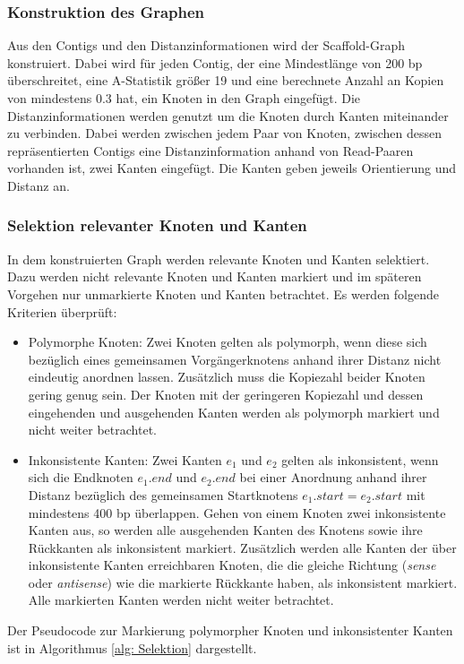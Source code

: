 \documentclass[a4paper,11pt,parskip]{scrartcl}
\begin{document}
\subsubsection{Konstruktion des Graphen}
Aus den Contigs und den Distanzinformationen wird der Scaffold-Graph
konstruiert. Dabei wird für jeden Contig, der eine Mindestlänge von
200 bp überschreitet, eine A-Statistik größer 19 und eine berechnete
Anzahl an Kopien von mindestens \num{0.3} hat, ein Knoten in den Graph
eingefügt. Die Distanzinformationen werden genutzt um die Knoten durch
Kanten miteinander zu verbinden. Dabei werden zwischen jedem Paar von
Knoten, zwischen dessen repräsentierten Contigs eine
Distanzinformation anhand von Read-Paaren vorhanden ist, zwei Kanten
eingefügt. Die Kanten geben jeweils Orientierung und Distanz an.

\subsubsection{Selektion relevanter Knoten und Kanten}
In dem konstruierten Graph werden relevante Knoten und Kanten
selektiert. Dazu werden nicht relevante Knoten und Kanten markiert und
im späteren Vorgehen nur unmarkierte Knoten und Kanten betrachtet. Es
werden folgende Kriterien überprüft:
\begin{itemize}
\item Polymorphe Knoten: Zwei Knoten gelten als polymorph, wenn diese
  sich bezüglich eines gemeinsamen Vorgängerknotens anhand ihrer
  Distanz nicht eindeutig anordnen lassen. Zusätzlich muss die
  Kopiezahl beider Knoten gering genug sein. Der Knoten mit der
  geringeren Kopiezahl und dessen eingehenden und ausgehenden Kanten
  werden als polymorph markiert und nicht weiter betrachtet.
\item Inkonsistente Kanten: Zwei Kanten $e_1$ und $e_2$ gelten als
  inkonsistent, wenn sich die Endknoten $e_1.end$ und $e_2.end$ bei
  einer Anordnung anhand ihrer Distanz bezüglich des gemeinsamen
  Startknotens $e_1.start = e_2.start$ mit mindestens 400 bp
  überlappen. Gehen von einem Knoten zwei inkonsistente Kanten aus, so
  werden alle ausgehenden Kanten des Knotens sowie ihre Rückkanten als
  inkonsistent markiert. Zusätzlich werden alle Kanten der über
  inkonsistente Kanten erreichbaren Knoten, die die gleiche Richtung
  (\textit{sense} oder \textit{antisense}) wie die markierte Rückkante
  haben, als inkonsistent markiert. Alle markierten Kanten werden
  nicht weiter betrachtet.
\end{itemize}
Der Pseudocode zur Markierung polymorpher Knoten und inkonsistenter
Kanten ist in Algorithmus \ref{alg: Selektion} dargestellt.
\end{document}

